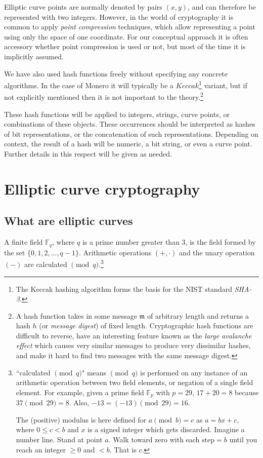 Elliptic curve points are normally denoted by pairs \((x, y)\), and can therefore be represented with two integers. However, in the world of cryptography it is common to apply {\em point compression} techniques, which allow representing a point using only the space of one coordinate. For our conceptual approach it is often accessory whether point compression is used or not, but most of the time it is implicitly assumed.

We have also used hash functions freely without specifying any concrete algorithms. In the case of Monero it will typically be a \(\mathit{Keccak}\)\footnote{\label{kekkak_note}The Keccak hashing algorithm forms the basis
for the NIST standard {\em SHA-3}.} 
variant, but if not explicitly mentioned then it is not important to the theory.\footnote{\label{hash_note}A hash function takes in some message $\mathfrak{m}$ of arbitrary length and returns a hash $h$ (or {\em message digest}) of fixed length. Cryptographic hash functions are difficult to reverse, have an interesting feature known as the {\em large avalanche effect} which causes very similar messages to produce very dissimilar hashes, and make it hard to find two messages with the same message digest.}

These hash functions will be applied to integers, strings, curve points, or combinations of these objects. These occurrences should be interpreted as hashes of bit representations, or the concatenation of such representations. Depending on context, the result of a hash will be numeric, a bit string, or even a curve point. Further details in this respect will be given as needed.




\section{Elliptic curve cryptography}
\label{EllipticCurveCryptography}

\subsection{What are elliptic curves}
\label{elliptic_curves_section}


A finite field \(\mathbb{F}_q\), where \(q\) is a prime number greater than 3, is the field formed by the set \(\{0, 1, 2, ..., q-1\}\). Arithmetic operations \((+,  \cdot)\) and the unary operation $(-)$ are calculated \( \pmod q\).\footnote{\label{modulus_note}``calculated \( \pmod q\)" means \( \pmod q\) is performed on any instance of an arithmetic operation between two field elements, or negation of a single field element. For example, given a prime field \(\mathbb{F}_p\) with $p = 29$, $17+20=8$ because $37 \pmod{29} = 8$. Also, $-13 = (-13) \pmod{29} = 16$.

The (positive) modulus is here defined for $a \pmod b = c$ as $a=bx+c$, where $0\leq{c}<{b}$ and $x$ is a signed integer which gets discarded. Imagine a number line. Stand at point $a$. Walk toward zero with each $\text{step} =b$ until you reach an integer $\geq{0}$ and $<b$. That is $c$.}


